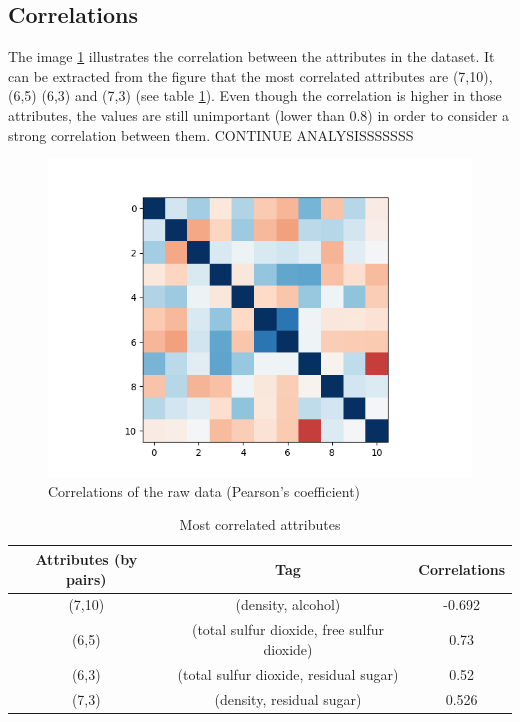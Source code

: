\documentclass[twoside,a4paper,12pt]{report}
\begin{document}
\subsection{Correlations}

The image \ref{CorrelationRaw} illustrates the correlation between the attributes in the dataset. 
It can be extracted from the figure that the most correlated attributes are (7,10), (6,5) (6,3) and 
(7,3) (see table \ref{ResumeCorrelation}).  Even though the correlation is higher in those attributes,
 the values are still unimportant (lower than 0.8) in order to consider a strong correlation between them.
  CONTINUE ANALYSISSSSSSS



\begin{figure}
    \centering
    \includegraphics[width=1\textwidth,height=0.5\textheight]{correlation_no_transformation.png}
    \caption{Correlations of the raw data (Pearson's coefficient)}
     \label{CorrelationRaw} 
\end{figure}

\begin{table}
    \centering
    \begin{tabular}{|| c|c|c||}
          \hline \hline
         Attributes (by pairs) & Tag & Correlations  \\
         \hline \hline
         (7,10) & (density, alcohol) & -0.692\\
         \hline
         (6,5) & (total sulfur dioxide, free sulfur dioxide) & 0.73  \\
         \hline
         (6,3) & (total sulfur dioxide, residual sugar) & 0.52 \\
         \hline
         (7,3) & (density, residual sugar) &0.526 \\
         \hline  \hline
    \end{tabular}
    \caption{Most correlated attributes     \label{ResumeCorrelation}
    }
\end{table}
\end{document}
